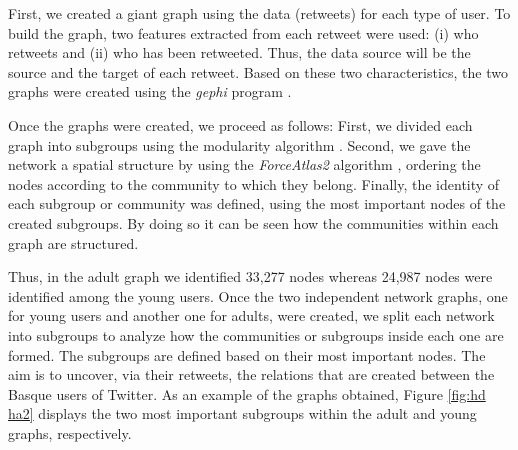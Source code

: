 \documentclass[information,article,submit,moreauthors,pdftex,10pt,a4paper]{Definitions/mdpi}
\begin{document}
First, we created a giant graph using the data (retweets) for each type of user. To build the graph, two features extracted from each retweet were used: (i) who retweets and (ii) who has been retweeted. Thus, the data source will be the source and the target of each retweet. Based on these two characteristics, the two graphs were created using the \textit{gephi} program \cite{bastian2009gephi}.

Once the graphs were created, we proceed as follows: First, we divided each graph into subgroups using the modularity algorithm \cite{blondel2008fast}. Second, we gave the network a spatial structure by using the \textit{ForceAtlas2} algorithm \cite{jacomy2014forceatlas2}, ordering the nodes according to the community to which they belong. Finally, the identity of each subgroup or community was defined, using the most important nodes of the created subgroups. By doing so it can be seen how the communities within each graph are structured.

Thus, in the adult graph we identified 33,277 nodes whereas 24,987 nodes were identified among the young users. Once the two independent network graphs, one for young users and another one for adults, were created, we split each network into subgroups to analyze how the communities or subgroups inside each one are formed. The subgroups are defined based on their most important nodes. The aim is to uncover, via their retweets, the relations that are created between the Basque users of Twitter. As an example of the graphs obtained, Figure \ref{fig:hd ha2} displays the two most important subgroups within the adult and young graphs, respectively.
\end{document}
